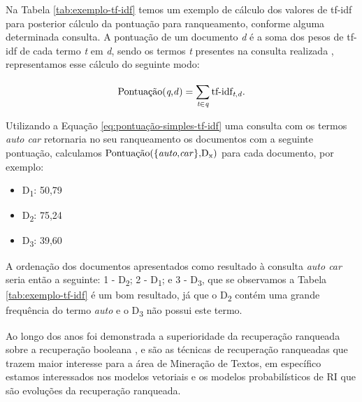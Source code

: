 

Na Tabela \ref{tab:exemplo-tf-idf} temos um exemplo de cálculo dos valores de tf-idf para posterior cálculo da pontuação para ranqueamento, conforme alguma determinada consulta. 
A pontuação de um documento \textit{d} é a soma dos pesos de tf-idf de cada termo \textit{t} em \textit{d}, sendo os termos \textit{t} presentes na consulta realizada \cite[p.~109]{Manning2008IIR}, representamos esse cálculo do seguinte modo:

\begin{equation}
    \label{eq:pontuação-simples-tf-idf}
    \text{Pontuação(\textit{q},\textit{d})} = \sum_{\textit{t} \in \textit{q}}^{} \text{tf-idf}_{\text{\textit{t},\textit{d}}}.
\end{equation}


Utilizando a Equação \ref{eq:pontuação-simples-tf-idf} uma consulta com os termos \textit{auto car} retornaria no seu ranqueamento os documentos com a seguinte pontuação, calculamos $\text{Pontuação(\{\textit{auto},\textit{car}\},D\textsubscript{x})}$ para cada documento, por exemplo:
\begin{itemize}
    \setlength\itemsep{-0.2em}
    \item D\textsubscript{1}: 50,79
    \item D\textsubscript{2}: 75,24
    \item D\textsubscript{3}: 39,60
\end{itemize}

A ordenação dos documentos apresentados como resultado à consulta \textit{auto car} seria então a seguinte: 1\textordmasculine{} - D\textsubscript{2}; 2\textordmasculine{} - D\textsubscript{1}; e 3\textordmasculine{} - D\textsubscript{3}, que se observamos a Tabela \ref{tab:exemplo-tf-idf} é um bom resultado, já que o D\textsubscript{2} contém uma grande frequência do termo \textit{auto} e o D\textsubscript{3} não possui este termo.


Ao longo dos anos foi demonstrada a superioridade da recuperação ranqueada sobre a recuperação booleana \cite{Jones:1981:IRE:539571}, e são as técnicas de recuperação ranqueadas que trazem maior interesse para a área de Mineração de Textos, em específico estamos interessados nos modelos vetoriais e os modelos probabilísticos de RI que são evoluções da recuperação ranqueada.

